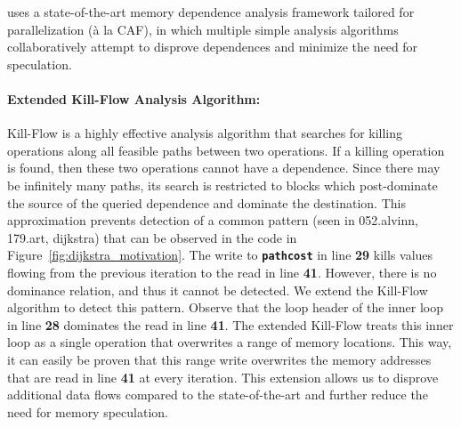 \name uses a state-of-the-art memory dependence analysis framework
tailored for parallelization (\`{a} la CAF\cite{johnson:14:pldi}), in
which multiple simple analysis algorithms collaboratively attempt to
disprove dependences and minimize the need for speculation.
%

\paragraph{Extended Kill-Flow Analysis Algorithm:}
Kill-Flow is a highly effective analysis algorithm that searches for
killing operations along all feasible paths between two operations. If
a killing operation is found, then these two operations cannot have a
dependence.  Since  there  may  be  infinitely  many  paths,  its
search is restricted to blocks which post-dominate the source of the
queried dependence and dominate the destination.
%
This approximation prevents detection of a common pattern (seen in
052.alvinn, 179.art, dijkstra) that can be observed in the code in
Figure~\ref{fig:dijkstra_motivation}.
%
The write to \texttt{\textbf{pathcost}} in line \textbf{29} kills
values flowing from the previous iteration to the read in line \textbf{41}.
However, there is no dominance
relation, and thus it cannot be detected.
%
We extend the Kill-Flow algorithm to detect this pattern. Observe that
the loop header of the inner loop in line \textbf{28} dominates the
read in line \textbf{41}. The extended Kill-Flow treats this inner loop as a single
operation that overwrites a range of memory locations. This way, it
can easily be proven that this range write overwrites
the memory addresses that are read in line \textbf{41} at every iteration.
%
%
This extension allows us to disprove additional data flows compared to
the state-of-the-art and further reduce the need for memory
speculation.
